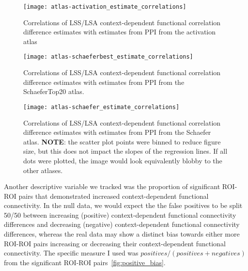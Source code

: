 \documentclass[phd,appendix,figures]{uithesis}
\begin{document}
\begin{figure}[H]
  \centering
  \texttt{[image: atlas-activation\_estimate\_correlations]}
  \caption[Correlation between LSA/LSS and PPI in the activation atlas]{
    Correlations of LSS/LSA context-dependent functional correlation difference estimates with
    estimates from PPI from the activation atlas
  }
  \label{fig:atlas-activation_correlations}
\end{figure}

\begin{figure}[H]
  \centering
  \texttt{[image: atlas-schaeferbest\_estimate\_correlations]}
  \caption[Correlation between LSA/LSS and PPI in the SchaeferTop20 atlas]{
    Correlations of LSS/LSA context-dependent functional correlation difference estimates with
    estimates from PPI from the SchaeferTop20 atlas.
  }
  \label{fig:atlas-schaeferbest_correlations}
\end{figure}

\begin{figure}[H]
  \centering
  \texttt{[image: atlas-schaefer\_estimate\_correlations]}
  \caption[Correlation between LSA/LSS and PPI in the Schaefer atlas]{
    Correlations of LSS/LSA context-dependent functional correlation difference estimates with
    estimates from PPI from the Schaefer atlas.
    \textbf{NOTE}: the scatter plot points were binned to reduce figure size, but
    this does not impact the slopes of the regression lines.
    If all dots were plotted, the image would look equivalently blobby
    to the other atlases.
  }
  \label{fig:atlas-schaefer_correlations}
\end{figure}

Another descriptive variable we tracked was the proportion of significant ROI-ROI pairs
that demonstrated increased context-dependent functional connectivity.
In the null data, we would expect the the false positives to be split 50/50 between
increasing (positive) context-dependent functional connectivity differences
and decreasing (negative) context-dependent functional connectivity differences,
whereas the real data may show a distinct bias towards either more ROI-ROI pairs
increasing or decreasing their context-dependent functional connectivity.
The specific measure I used was $positives / (positives + negatives)$ from the significant ROI-ROI pairs~\ref{fig:positive_bias}.
\end{document}
